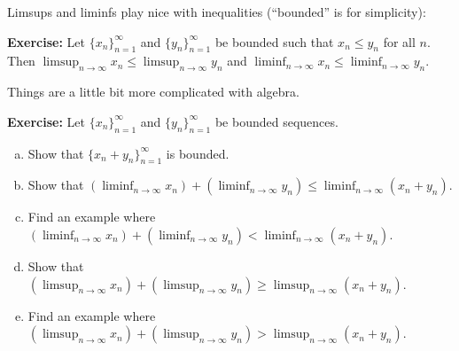 \documentclass[10pt,aspectratio=149]{beamer}
\begin{document}
\begin{frame}

Limsups and liminfs play nice with inequalities (``bounded'' is for simplicity):

\pause
\medskip

\textbf{Exercise:}
Let $\{ x_n \}_{n=1}^\infty$ and $\{ y_n \}_{n=1}^\infty$ be bounded such that
$x_n \leq y_n$ for all $n$.  Then
\quad
$\displaystyle
\limsup_{n\to\infty} x_n \leq
\limsup_{n\to\infty} y_n$
\quad
and
\quad
$\displaystyle
\liminf_{n\to\infty} x_n \leq
\liminf_{n\to\infty} y_n$.

\pause
\medskip

Things are a little bit more complicated with algebra.

\pause
\medskip

\textbf{Exercise:}
Let $\{ x_n \}_{n=1}^\infty$ and $\{ y_n \}_{n=1}^\infty$ be bounded sequences.
\begin{enumerate}[a)]
\item\pause
Show that $\{ x_n + y_n \}_{n=1}^\infty$ is bounded.
\item
Show that
\quad $\displaystyle
\left(\liminf_{n\to \infty} x_n\right)
+
\left(\liminf_{n\to \infty} y_n\right)
\leq
\liminf_{n\to \infty} (x_n+y_n)$.
\item\pause
Find an example where
$\displaystyle
\left(\liminf_{n\to \infty} x_n\right)
+
\left(\liminf_{n\to \infty} y_n\right)
<
\liminf_{n\to \infty} (x_n+y_n)$.
\item\pause
Show that
\quad $\displaystyle
\left(\limsup_{n\to \infty} x_n\right)
+
\left(\limsup_{n\to \infty} y_n\right)
\geq
\limsup_{n\to \infty} (x_n+y_n)$.
\item\pause
Find an example where
$\displaystyle
\left(\limsup_{n\to \infty} x_n\right)
+
\left(\limsup_{n\to \infty} y_n\right)
>
\limsup_{n\to \infty} (x_n+y_n)$.
\end{enumerate}

\end{frame}
\end{document}
